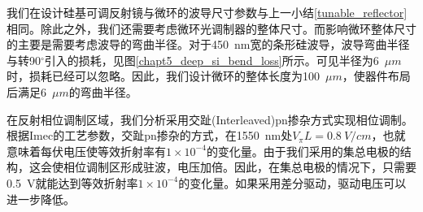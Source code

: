 我们在设计硅基可调反射镜与微环的波导尺寸参数与上一小结\ref{tunable_reflector}相同。除此之外，我们还需要考虑微环光调制器的整体尺寸。而影响微环整体尺寸的主要是需要考虑波导的弯曲半径。对于450~nm宽的条形硅波导，波导弯曲半径与转90$^\circ$引入的损耗，见图\ref{chapt5_deep_si_bend_loss}所示。可见半径为6~$\mu m$时，损耗已经可以忽略。因此，我们设计微环的整体长度为100~$\mu m$，使器件布局后满足6~$\mu m$的弯曲半径。

在反射相位调制区域，我们分析采用交趾(Interleaved)pn掺杂方式实现相位调制。根据Imec的工艺参数\cite{Imec}，交趾pn掺杂的方式\cite{li2009silicon,pantouvaki2013comparison}，在1550~nm处$V_\pi L = 0.8~V/cm$，也就意味着每伏电压使等效折射率有$1 \times  10^{-4}$的变化量。由于我们采用的集总电极的结构，这会使相位调制区形成驻波，电压加倍。因此，在集总电极的情况下，只需要0.5~V就能达到等效折射率$1 \times  10^{-4}$的变化量。如果采用差分驱动，驱动电压可以进一步降低\cite{Ding2013electro,zortman2011low}。


